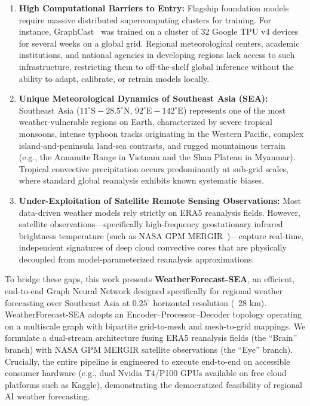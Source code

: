 \begin{enumerate}
    \item \textbf{High Computational Barriers to Entry:} Flagship foundation models require massive distributed supercomputing clusters for training. For instance, GraphCast~\cite{lam2023learning} was trained on a cluster of 32 Google TPU v4 devices for several weeks on a global grid. Regional meteorological centers, academic institutions, and national agencies in developing regions lack access to such infrastructure, restricting them to off-the-shelf global inference without the ability to adapt, calibrate, or retrain models locally.
    \item \textbf{Unique Meteorological Dynamics of Southeast Asia (SEA):} Southeast Asia ($11^\circ\text{S} - 28.5^\circ\text{N}$, $92^\circ\text{E} - 142^\circ\text{E}$) represents one of the most weather-vulnerable regions on Earth, characterized by severe tropical monsoons, intense typhoon tracks originating in the Western Pacific, complex island-and-peninsula land-sea contrasts, and rugged mountainous terrain (e.g., the Annamite Range in Vietnam and the Shan Plateau in Myanmar). Tropical convective precipitation occurs predominantly at sub-grid scales, where standard global reanalysis exhibits known systematic biases.
    \item \textbf{Under-Exploitation of Satellite Remote Sensing Observations:} Most data-driven weather models rely strictly on ERA5 reanalysis fields. However, satellite observations—specifically high-frequency geostationary infrared brightness temperature (such as NASA GPM MERGIR~\cite{janowiak2001mergir})—capture real-time, independent signatures of deep cloud convective cores that are physically decoupled from model-parameterized reanalysis approximations.
\end{enumerate}

To bridge these gaps, this work presents \textbf{WeatherForecast-SEA}, an efficient, end-to-end Graph Neural Network designed specifically for regional weather forecasting over Southeast Asia at $0.25^\circ$ horizontal resolution (~28 km). WeatherForecast-SEA adopts an Encoder--Processor--Decoder topology operating on a multiscale graph with bipartite grid-to-mesh and mesh-to-grid mappings. We formulate a dual-stream architecture fusing ERA5 reanalysis fields (the ``Brain'' branch) with NASA GPM MERGIR satellite observations (the ``Eye'' branch). Crucially, the entire pipeline is engineered to execute end-to-end on accessible consumer hardware (e.g., dual Nvidia T4/P100 GPUs available on free cloud platforms such as Kaggle), demonstrating the democratized feasibility of regional AI weather forecasting.

